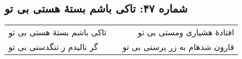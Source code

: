\begin{center}
\section*{شماره ۴۷: تاکی باشم بستۀ هستی بی تو}
\label{sec:047}
\begin{longtable}{l p{0.5cm} r}
تاکی باشم بستهٔ هستی بی تو
&&
افتادهٔ هشیاری ومستی بی تو
\\
گر نالیدم ز تنگدستی بی تو
&&
قارون شدهام به زر پرستی بی تو
\\
\end{longtable}
\end{center}
